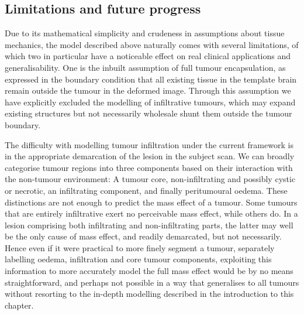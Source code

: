 \subsection{Limitations and future progress}

Due to its mathematical simplicity and crudeness in assumptions about tissue mechanics, the model described above naturally comes with several limitations, of which two in particular have a noticeable effect on real clinical applications and generalisability.
One is the inbuilt assumption of full tumour encapsulation, as expressed in the boundary condition that all existing tissue in the template brain remain outside the tumour in the deformed image.
Through this assumption we have explicitly excluded the modelling of infiltrative tumours, which may expand existing structures but not necessarily wholesale shunt them outside the tumour boundary.

The difficulty with modelling tumour infiltration under the current framework is in the appropriate demarcation of the lesion in the subject scan.
We can broadly categorise tumour regions into three components based on their interaction with the non-tumour environment:
A tumour core, non-infiltrating and possibly cystic or necrotic, an infiltrating component, and finally peritumoural oedema.
These distinctions are not enough to predict the mass effect of a tumour.
Some tumours that are entirely infiltrative exert no perceivable mass effect, while others do.
In a lesion comprising both infiltrating and non-infiltrating parts, the latter may well be the only cause of mass effect, and readily demarcated, but not necessarily.
Hence even if it were practical to more finely segment a tumour, separately labelling oedema, infiltration and core tumour components, exploiting this information to more accurately model the full mass effect would be by no means straightforward, and perhaps not possible in a way that generalises to all tumours without resorting to the in-depth modelling described in the introduction to this chapter.

